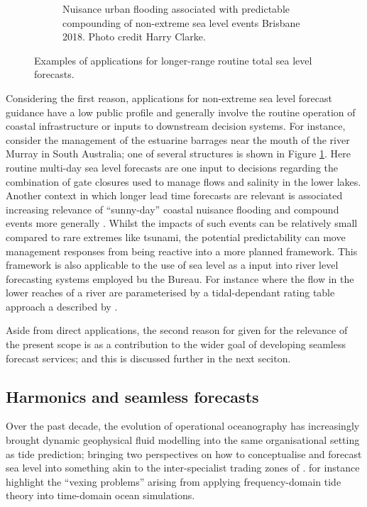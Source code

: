 \begin{figure}[!hbt]
\begin{subfigure}[t]{\figwidthHalf}
      \caption{Nuisance urban flooding associated with predictable compounding of non-extreme sea level events Brisbane 2018. Photo credit Harry Clarke.}
  \end{subfigure}
  \caption{Examples of applications for longer-range routine total sea level forecasts.} 
  \label{fig:applicationPhotos}
\end{figure}


Considering the first reason, applications for non-extreme sea level forecast guidance have a low public profile and generally involve the routine operation of coastal infrastructure or inputs to downstream decision systems.
For instance, consider the management of the estuarine barrages near the mouth of the river Murray in South Australia; one of several structures is shown in Figure \ref{fig:applicationPhotos}.  Here routine multi-day sea level forecasts are one input to decisions regarding the combination of gate closures used to manage flows and salinity in the lower lakes.  
Another context in which longer lead time forecasts are relevant is associated increasing relevance of ``sunny-day'' coastal nuisance flooding \citep{10.1007/s11069-021-04600-4} and compound events more generally \citep{McInnes:2016km}.   Whilst the impacts of such events can be relatively small compared to rare extremes like tsunami, the potential predictability can move  management responses from being reactive into a more planned framework.   
This framework is also applicable to the use of sea level as a input into river level forecasting systems employed bu the Bureau.  For instance where the flow in the lower reaches of a river are parameterised by a tidal-dependant rating table approach a described by \citet{Leahy:2007tx}.


Aside from direct applications, the second reason for given for the relevance of the present scope is as a contribution to the wider goal of developing seamless forecast services; and this is discussed further in the next seciton. 

\subsection{Harmonics and seamless forecasts}
\label{sec:concrete}
Over the past decade, the evolution of operational oceanography has increasingly brought dynamic geophysical fluid modelling into the same organisational setting as tide prediction\citep{10.1080/1755876x.2019.1685834};  bringing two perspectives on how to conceptualise and forecast sea level into something akin to the inter-specialist trading zones of  \citet{Galison:1996uc}.  \citet{Jayne:2001tr} for instance highlight the ``vexing problems'' arising from applying frequency-domain tide theory into time-domain ocean simulations.


